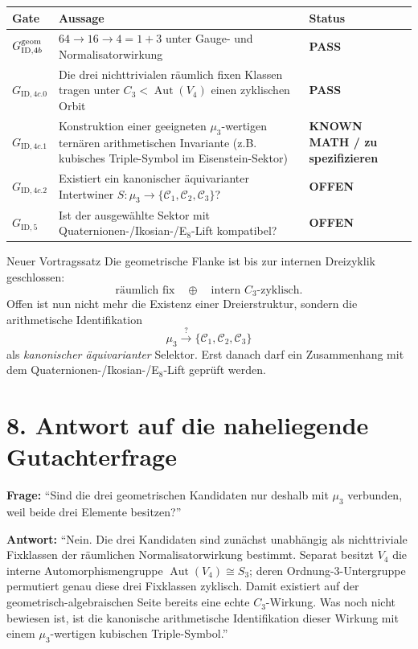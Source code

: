 \documentclass[11pt,a4paper]{article}
\begin{document}
\begin{center}
\renewcommand{\arraystretch}{1.25}
\begin{tabularx}{\textwidth}{>{\bfseries}p{2.2cm} X p{2.8cm}}
\toprule
Gate & Aussage & Status\\
\midrule
$G_{\mathrm{ID},4b}^{\rm geom}$ & $64\to16\to4=1+3$ unter Gauge- und Normalisatorwirkung & \textbf{PASS}\\
$G_{\mathrm{ID},4c.0}$ & Die drei nichttrivialen räumlich fixen Klassen tragen unter $C_3<\operatorname{Aut}(V_4)$ einen zyklischen Orbit & \textbf{PASS}\\
$G_{\mathrm{ID},4c.1}$ & Konstruktion einer geeigneten $\mu_3$-wertigen ternären arithmetischen Invariante (z.B. kubisches Triple-Symbol im Eisenstein-Sektor) & \textbf{KNOWN MATH / zu spezifizieren}\\
$G_{\mathrm{ID},4c.2}$ & Existiert ein kanonischer äquivarianter Intertwiner $S:\mu_3\to\{\mathcal C_1,\mathcal C_2,\mathcal C_3\}$? & \textbf{OFFEN}\\
$G_{\mathrm{ID},5}$ & Ist der ausgewählte Sektor mit Quaternionen-/Ikosian-/E$_8$-Lift kompatibel? & \textbf{OFFEN}\\
\bottomrule
\end{tabularx}
\end{center}

\begin{statusbox}{Neuer Vortragssatz}
Die geometrische Flanke ist bis zur internen Dreizyklik geschlossen:
\[
\boxed{
\text{räumlich fix}
\quad\oplus\quad
\text{intern }C_3\text{-zyklisch}.}
\]
Offen ist nun nicht mehr die Existenz einer Dreierstruktur, sondern die arithmetische Identifikation
\[
\boxed{
\mu_3
\stackrel{?}{\longrightarrow}
\{\mathcal C_1,\mathcal C_2,\mathcal C_3\}}
\]
als \emph{kanonischer äquivarianter} Selektor. Erst danach darf ein Zusammenhang mit dem Quaternionen-/Ikosian-/E$_8$-Lift geprüft werden.
\end{statusbox}

\section*{8. Antwort auf die naheliegende Gutachterfrage}

\textbf{Frage:} ``Sind die drei geometrischen Kandidaten nur deshalb mit $\mu_3$ verbunden, weil beide drei Elemente besitzen?''

\textbf{Antwort:} ``Nein. Die drei Kandidaten sind zunächst unabhängig als nichttriviale Fixklassen der räumlichen Normalisatorwirkung bestimmt. Separat besitzt $V_4$ die interne Automorphismengruppe $\operatorname{Aut}(V_4)\cong S_3$; deren Ordnung-$3$-Untergruppe permutiert genau diese drei Fixklassen zyklisch. Damit existiert auf der geometrisch-algebraischen Seite bereits eine echte $C_3$-Wirkung. Was noch nicht bewiesen ist, ist die kanonische arithmetische Identifikation dieser Wirkung mit einem $\mu_3$-wertigen kubischen Triple-Symbol.''
\end{document}
